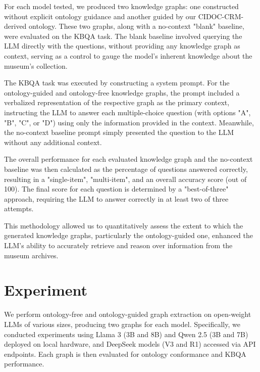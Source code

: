 \documentclass[a4, conference]{IEEEtran}
\begin{document}
For each model tested, we produced two knowledge graphs: one constructed without explicit ontology guidance and another guided by our CIDOC-CRM-derived ontology. These two graphs, along with a no-context "blank" baseline, were evaluated on the KBQA task. The blank baseline involved querying the LLM directly with the questions, without providing any knowledge graph as context, serving as a control to gauge the model's inherent knowledge about the museum's collection.

The KBQA task was executed by constructing a system prompt. For the ontology-guided and ontology-free knowledge graphs, the prompt included a verbalized representation of the respective graph as the primary context, instructing the LLM to answer each multiple-choice question (with options "A", "B", "C", or "D") using only the information provided in the context. Meanwhile, the no-context baseline prompt simply presented the question to the LLM without any additional context.

The overall performance for each evaluated knowledge graph and the no-context baseline was then calculated as the percentage of questions answered correctly, resulting in a "single-item", "multi-item", and an overall accuracy score (out of 100). The final score for each question is determined by a "best-of-three" approach, requiring the LLM to answer correctly in at least two of three attempts.

This methodology allowed us to quantitatively assess the extent to which the generated knowledge graphs, particularly the ontology-guided one, enhanced the LLM's ability to accurately retrieve and reason over information from the museum archives.

\section{Experiment}

We perform ontology-free and ontology-guided graph extraction on open-weight LLMs of various sizes, producing two graphs for each model. Specifically, we conducted experiments using Llama 3 \cite{grattafiori2024llama3herdmodels} (3B and 8B) and Qwen 2.5 \cite{qwen2025qwen25technicalreport} (3B and 7B) deployed on local hardware, and DeepSeek \cite{deepseekai2024deepseekv3technicalreport,deepseekai2025deepseekr1incentivizingreasoningcapability} models (V3 and R1) accessed via API endpoints. Each graph is then evaluated for ontology conformance and KBQA performance.
\end{document}
